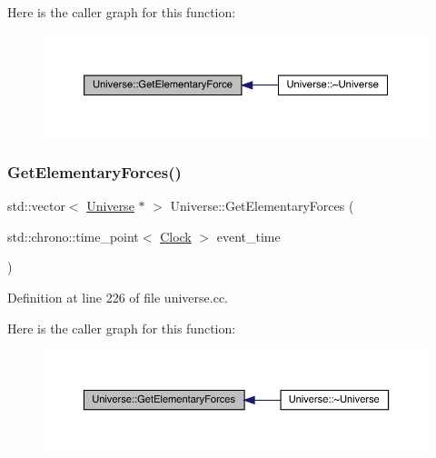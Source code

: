 Here is the caller graph for this function\+:
\nopagebreak
\begin{figure}[H]
\begin{center}
\leavevmode
\includegraphics[width=350pt]{class_universe_a9506017d944cb64e67567477c1505a53_icgraph}
\end{center}
\end{figure}
\mbox{\label{class_universe_a6a8ed579b2eedd3aceebda9f3d78aa0e}} 
\subsubsection{\texorpdfstring{Get\+Elementary\+Forces()}{GetElementaryForces()}}
{\footnotesize\ttfamily std\+::vector$<$ \hyperlink{class_universe}{Universe} $\ast$ $>$ Universe\+::\+Get\+Elementary\+Forces (\begin{DoxyParamCaption}\item[{std\+::chrono\+::time\+\_\+point$<$ \hyperlink{universe_8h_a0ef8d951d1ca5ab3cfaf7ab4c7a6fd80}{Clock} $>$}]{event\+\_\+time }\end{DoxyParamCaption})}



Definition at line 226 of file universe.\+cc.

Here is the caller graph for this function\+:
\nopagebreak
\begin{figure}[H]
\begin{center}
\leavevmode
\includegraphics[width=350pt]{class_universe_a6a8ed579b2eedd3aceebda9f3d78aa0e_icgraph}
\end{center}
\end{figure}
\mbox{\label{class_universe_acef54e17666d17078c522388f8f6e4f9}} 
